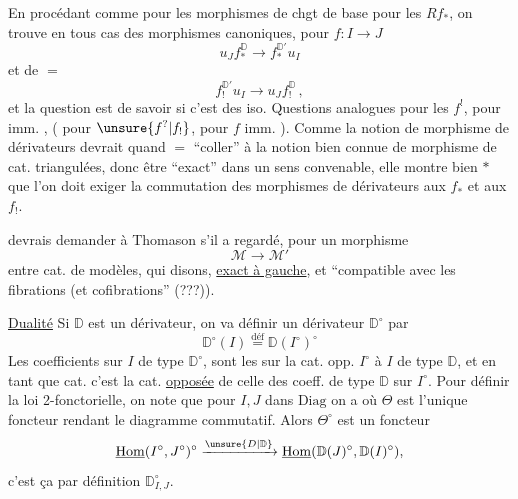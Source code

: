 En procédant comme pour les morphismes de chgt de base pour les $Rf_*$, on trouve en tous cas des morphismes canoniques, pour $f:I\longrightarrow J$
\[
u_J f_*^{\mathbb D}\longrightarrow f_*^{\mathbb D'}u_I
\]
et de $=$
\[
f_!^{\mathbb D'}u_I\longrightarrow u_J f_!^{\mathbb D}\,,
\]
et la question est de savoir si c'est des iso.
Questions analogues pour les $f^!$, pour imm. , ( pour $\unsure{f^?|f_!}$, pour $f$ imm. ). Comme la notion de morphisme de dérivateurs devrait quand $=$ ``coller'' à la notion bien connue de morphisme  de cat. triangulées, donc être ``exact'' dans un sens convenable, elle montre bien $*$ que l'on doit exiger la commutation des  morphismes de dérivateurs aux $f_*$ et aux $f_!$.

 devrais demander à Thomason s'il a regardé, pour un morphisme
\[
\mathcal M\longrightarrow\mathcal M'
\]
entre cat. de modèles, qui   disons, \uline{exact à gauche}, et ``compatible avec les  fibrations (et cofibrations'' (???)).

\uline{Dualité} Si $\mathbb D$ est un dérivateur, on va définir un dérivateur  $\mathbb D^\circ$ par
\[
\mathbb D^\circ(I)\overset{\text{déf}}{=}\mathbb D(I^\circ)^\circ
\]
Les coefficients sur $I$  de type $\mathbb D^\circ$, sont les  sur la cat. opp. $I^\circ$ à $I$ de type $\mathbb D$, et en tant que cat. c'est la cat. \uline{opposée} de celle des coeff. de type $\mathbb D$ sur $I^\circ$. Pour définir la loi 2-fonctorielle, on note que pour $I,J$ dans $\mathrm{Diag}$ on a
où $\Theta$ est l'unique foncteur rendant le diagramme commutatif. Alors $\Theta^\circ$ est un foncteur
\[
\underline{\mathrm{Hom}}(I^\circ,J^\circ)^\circ\xrightarrow{\unsure{D|\mathbb D}}\underline{\mathrm{Hom}}(\mathbb D(J)^\circ,\mathbb D(I)^\circ),
\]
c'est ça par définition $\mathbb D^\circ_{I,J}$.

